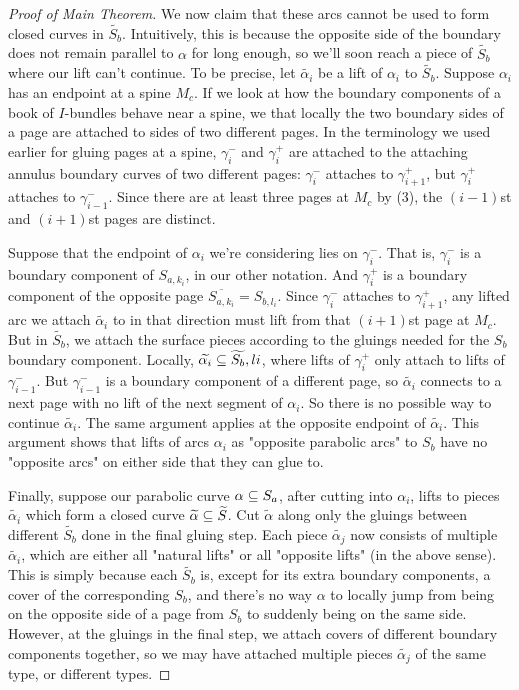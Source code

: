 \begin{proof}[Proof of Main Theorem]
We now claim that these arcs cannot be used to form closed curves in
$\widetilde{S_b}$.  Intuitively, this is because the opposite side of the
boundary does not remain parallel to $\alpha$ for long enough, so we'll soon
reach a piece of $\widetilde{S_b}$ where our lift can't continue.  To be
precise, let $\widetilde{\alpha_i}$ be a lift of $\alpha_i$ to
$\widetilde{S_b}$.  Suppose $\alpha_i$ has an endpoint at a spine $M_c$. If we
look at how the boundary components of a book of $I$-bundles behave near
a spine, we that locally the two boundary sides of a page are attached to sides
of two different pages.  In the terminology we used earlier for gluing pages at
a spine, $\gamma_i^-$ and $\gamma_i^+$ are attached to the attaching annulus
boundary curves of two different pages: $\gamma_i^-$ attaches to
$\gamma_{i+1}^+$, but $\gamma_i^+$ attaches to $\gamma_{i-1}^-$.  Since there
are at least three pages at $M_c$ by (3), the $(i-1)$st and $(i+1)$st pages are
distinct.

Suppose that the endpoint of $\alpha_i$ we're considering lies on $\gamma_i^-$. That
is, $\gamma_i^-$ is a boundary component of $S_{a,k_i}$, in our other notation. And
$\gamma_i^+$ is a boundary component of the opposite page $\overline{S_{a,k_i}} = S_{b,l_i}$.
Since $\gamma_i^-$ attaches to $\gamma_{i+1}^+$, any lifted arc we attach
$\widetilde{\alpha_i}$ to in that direction must lift from that $(i+1)$st page at $M_c$.
But in $\widetilde{S_b}$, we attach the surface pieces according to the gluings needed
for the $S_b$ boundary component.  Locally, $\widetilde{\alpha_i} \subseteq \widetilde{S_b},li$, where
lifts of $\gamma_i^+$ only attach to lifts of $\gamma_{i-1}^-$. But $\gamma_{i-1}^-$ is
a boundary component of a different page, so $\widetilde{\alpha_i}$ connects to a next
page with no lift of the next segment of $\alpha_i$. So there is no possible way
to continue $\widetilde{\alpha_i}$.  The same argument applies at the opposite endpoint
of $\widetilde{\alpha_i}$. This argument shows that lifts of arcs $\alpha_i$ as "opposite
parabolic arcs" to $S_b$ have no "opposite arcs" on either side that they can
glue to.

Finally, suppose our parabolic curve $\alpha \subseteq S_a$, after cutting into
$\alpha_i$, lifts to pieces $\widetilde{\alpha_i}$ which form a closed curve $\widetilde{\alpha}
\subseteq \widetilde{S}$.  Cut $\widetilde{\alpha}$ along only the gluings between different
$\widetilde{S_b}$ done in the final gluing step. Each piece $\widetilde{\alpha_j}$ now consists
of multiple $\widetilde{\alpha_i}$, which are either all "natural lifts" or all
"opposite lifts" (in the above sense). This is simply because each $\widetilde{S_b}$
is, except for its extra boundary components, a cover of the corresponding
$S_b$, and there's no way $\alpha$ to locally jump from being on the opposite
side of a page from $S_b$ to suddenly being on the same side. However, at the
gluings in the final step, we attach covers of different boundary components
together, so we may have attached multiple pieces $\widetilde{\alpha_j}$ of the same
type, or different types.


\end{proof}
